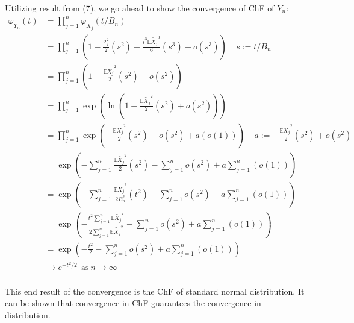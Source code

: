 \documentclass[]{article}
\begin{document}
Utilizing result from (7), we go ahead to show the convergence of ChF of $Y_n$:
\begin{align*} 
\varphi_{Y_n} (t) &= \prod_{j=1}^n \varphi_{\tilde{X_j}} (t / B_n) \\
&= \prod_{j=1}^n \left(1 - \frac{\sigma_j^2}{2} (s^2) + \frac{i^3 \mathbb{E}{\tilde{X_j}^3}}{6} (s^3) + o(s^3) \right)  \ \ \ \  \ s := t / B_n\\
&= \prod_{j=1}^n \left( 1 - \frac{\mathbb{E} \tilde{X_j}^2}{2} (s^2) + o(s^2) \right)\\
&= \prod_{j=1}^n \exp{\left( \ln{\left(1 - \frac{\mathbb{E} \tilde{X_j}^2}{2} (s^2) + o(s^2)\right)} \right)}\\
&= \prod_{j=1}^n \exp{\left(-\frac{\mathbb{E} \tilde{X_j}^2}{2} (s^2) + o(s^2) + a (o(1)) \right) } \ \ \ \  \ a := -\frac{\mathbb{E} \tilde{X_j}^2}{2} (s^2) + o(s^2)\\
&= \exp{\left( -\sum_{j = 1}^n \frac{\mathbb{E} \tilde{X_j}^2}{2} (s^2) - \sum_{j=1}^{n} o(s^2) + a\sum_{j=1}^{n}(o(1)) \right) } \\
&= \exp{\left( -\sum_{j = 1}^n \frac{\mathbb{E} \tilde{X_j}^2}{2 B_n^2} (t^2) - \sum_{j=1}^{n} o(s^2) + a\sum_{j=1}^{n}(o(1)) \right) } \\
&= \exp{\left( - \frac{t^2\sum_{j = 1}^n\mathbb{E} \tilde{X_j}^2}{2\sum_{j = 1}^n\mathbb{E} \tilde{X_j}^2} - \sum_{j=1}^{n} o(s^2) + a\sum_{j=1}^{n}(o(1)) \right) } \\
&= \exp{\left( - \frac{t^2}{2} - \sum_{j=1}^{n} o(s^2) + a\sum_{j=1}^{n}(o(1)) \right) } \\
&\xrightarrow[]{} e^{-t^2 / 2}  \ \ \text{as}\  n \xrightarrow[]{} \infty
\end{align*}

This end result of the convergence is the ChF of standard normal distribution. It can be shown that convergence in ChF guarantees the convergence in distribution. \qedsymbol
\end{document}
